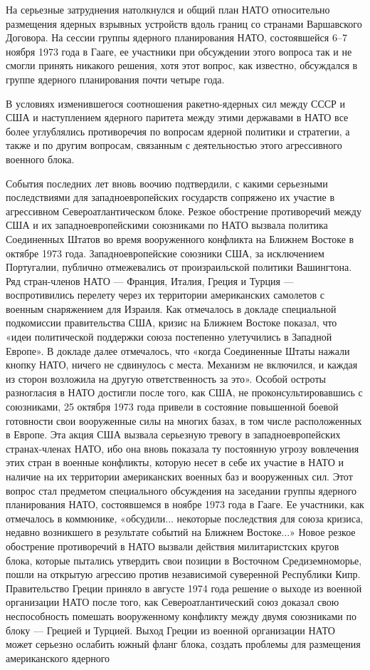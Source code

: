 \documentclass[12pt, a4paper, openany]{book}
\begin{document}
На серьезные затруднения натолкнулся и общий план НАТО относительно размещения ядерных взрывных устройств вдоль границ со странами Варшавского Договора. На сессии группы ядерного планирования НАТО, состоявшейся 6–7 ноября 1973 года в Гааге, ее участники при обсуждении этого вопроса так и не смогли принять никакого решения, хотя этот вопрос, как известно, обсуждался в группе ядерного планирования почти четыре года.
	
	В условиях изменившегося соотношения ракетно-ядерных сил между СССР и США и наступлением ядерного паритета между этими державами в НАТО все более углублялись противоречия по вопросам ядерной политики и стратегии, а также и по другим вопросам, связанным с деятельностью этого агрессивного военного блока.
	
	События последних лет вновь воочию подтвердили, с какими серьезными последствиями для западноевропейских государств сопряжено их участие в агрессивном Североатлантическом блоке. Резкое обострение противоречий между США и их западноевропейскими союзниками по НАТО вызвала политика Соединенных Штатов во время вооруженного конфликта на Ближнем Востоке в октябре 1973 года. Западноевропейские союзники США, за исключением Португалии, публично отмежевались от произраильской политики Вашингтона. Ряд стран-членов НАТО — Франция, Италия, Греция и Турция — воспротивились перелету через их территории американских самолетов с военным снаряжением для Израиля. Как отмечалось в докладе специальной подкомиссии правительства США, кризис на Ближнем Востоке показал, что «идеи политической поддержки союза постепенно улетучились в Западной Европе». В докладе далее отмечалось, что «когда Соединенные Штаты нажали кнопку НАТО, ничего не сдвинулось с места. Механизм не включился, и каждая из сторон возложила на другую ответственность за это». Особой остроты разногласия в НАТО достигли после того, как США, не проконсультировавшись с союзниками, 25 октября 1973 года привели в состояние повышенной боевой готовности свои вооруженные силы на многих базах, в том числе расположенных в Европе. Эта акция США вызвала серьезную тревогу в западноевропейских странах-членах НАТО, ибо она вновь показала ту постоянную угрозу вовлечения этих стран в военные конфликты, которую несет в себе их участие в НАТО и наличие на их территории американских военных баз и вооруженных сил. Этот вопрос стал предметом специального обсуждения на заседании группы ядерного планирования НАТО, состоявшемся в ноябре 1973 года в Гааге. Ее участники, как отмечалось в коммюнике, «обсудили... некоторые последствия для союза кризиса, недавно возникшего в результате событий на Ближнем Востоке...» Новое резкое обострение противоречий в НАТО вызвали действия милитаристских кругов блока, которые пытались утвердить свои позиции в Восточном Средиземноморье, пошли на открытую агрессию против независимой суверенной Республики Кипр. Правительство Греции приняло в августе 1974 года решение о выходе из военной организации НАТО после того, как Североатлантический союз доказал свою неспособность помешать вооруженному конфликту между двумя союзниками по блоку — Грецией и Турцией. Выход Греции из военной организации НАТО может серьезно ослабить южный фланг блока, создать проблемы для размещения американского ядерного 
\end{document}
